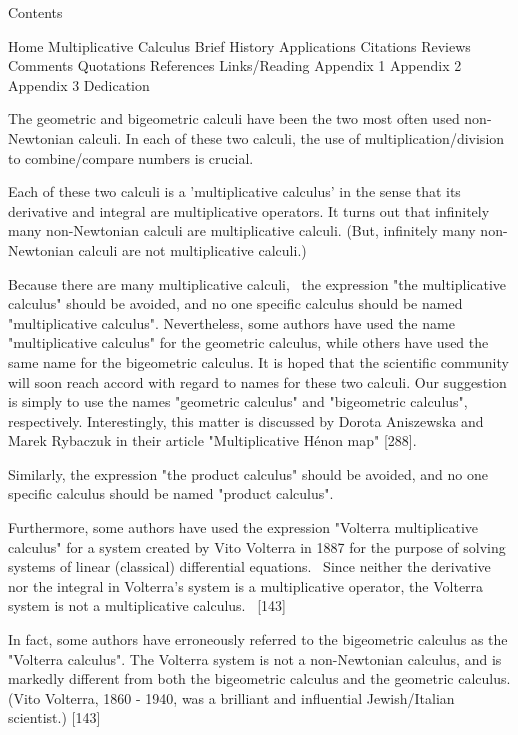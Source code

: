 \documentclass[12pt]{article}
\begin{document}
Contents

Home
Multiplicative Calculus
Brief History
Applications
Citations
Reviews
Comments
Quotations
References
Links/Reading
Appendix 1
Appendix 2
Appendix 3
Dedication


The geometric and bigeometric calculi have been the two most often used non-Newtonian calculi. In each of these two calculi, the use of multiplication/division to combine/compare numbers is crucial.

Each of these two calculi is a 'multiplicative calculus' in the sense that its derivative and integral are multiplicative operators. It turns out that infinitely many non-Newtonian calculi are multiplicative calculi. (But, infinitely many non-Newtonian calculi are not multiplicative calculi.)


Because there are many multiplicative calculi,  the expression "the multiplicative calculus" should be avoided, and no one specific calculus should be named "multiplicative calculus". Nevertheless, some authors have used the name "multiplicative calculus" for the geometric calculus, while others have used the same name for the bigeometric calculus. It is hoped that the scientific community will soon reach accord with regard to names for these two calculi. Our suggestion is simply to use the names "geometric calculus" and "bigeometric calculus", respectively. Interestingly, this matter is discussed by Dorota Aniszewska and Marek Rybaczuk in their article "Multiplicative Hénon map" [288].

Similarly, the expression "the product calculus" should be avoided, and no one specific calculus should be named "product calculus".

Furthermore, some authors have used the expression "Volterra multiplicative calculus" for a system created by Vito Volterra in 1887 for the purpose of solving systems of linear (classical) differential equations.  Since neither the derivative nor the integral in Volterra's system is a multiplicative operator, the Volterra system is not a multiplicative calculus.  [143]

In fact, some authors have erroneously referred to the bigeometric calculus as the "Volterra calculus". The Volterra system is not a non-Newtonian calculus, and is markedly different from both the bigeometric calculus and the geometric calculus. (Vito Volterra, 1860 - 1940, was a brilliant and influential Jewish/Italian scientist.) [143]
\end{document}
